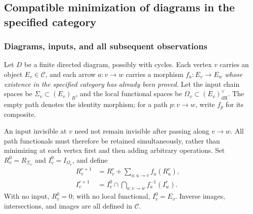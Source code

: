 \documentclass[11pt,a4paper,oneside]{article}
\theoremstyle{plain}
\theoremstyle{definition}
\theoremstyle{remark}
\newcommand{\dR}{\mathrm{dR}}
\numberwithin{equation}{section}
\begin{document}
\subsection{Compatible minimization of diagrams in the specified category}
\subsubsection{Diagrams, inputs, and all subsequent observations}
Let $D$ be a finite directed diagram, possibly with cycles. Each vertex $v$ carries an object $E_v\in\mathcal C$,
and each arrow $a:v\to w$ carries a morphism $f_a:E_v\to E_w$ \emph{whose existence in the specified category has already been proved}.
Let the input chain spaces be $\Sigma_v\subset(E_v)_B$,
and the local functional spaces be $\Omega_v\subset(E_v)_{\dR}^{\vee}$.
The empty path denotes the identity morphism; for a path $p:v\to w$, write $f_p$ for its composite.

An input invisible at $v$ need not remain invisible after passing along $v\to w$.
All path functionals must therefore be retained simultaneously, rather than minimizing at each vertex first and then adding arbitrary operations.
Set $R_v^0=R_{\Sigma_v}$ and $I_v^0=I_{\Omega_v}$, and define
\begin{align}
 R_v^{r+1}&=R_v^r+\sum_{a:u\to v}f_a(R_u^r),\label{ops:eq:Riter}\\
 I_v^{r+1}&=I_v^0\cap\bigcap_{a:v\to w}f_a^{-1}(I_w^r).
 \label{ops:eq:Iiter}
\end{align}
With no input, $R_v^0=0$; with no local functional, $I_v^0=E_v$.
Inverse images, intersections, and images are all defined in $\mathcal C$.
\end{document}
